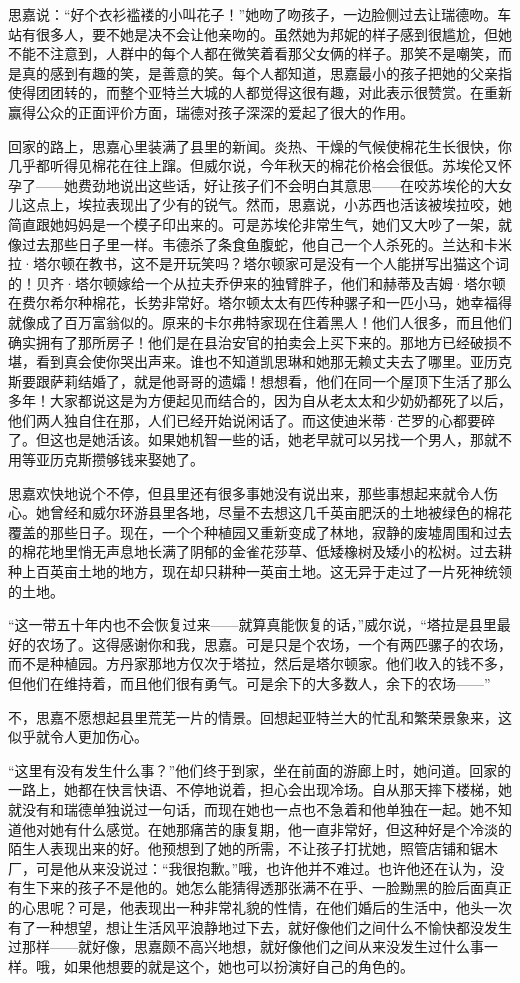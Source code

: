 \par 思嘉说：“好个衣衫褴褛的小叫花子！”她吻了吻孩子，一边脸侧过去让瑞德吻。车站有很多人，要不她是决不会让他亲吻的。虽然她为邦妮的样子感到很尴尬，但她不能不注意到，人群中的每个人都在微笑着看那父女俩的样子。那笑不是嘲笑，而是真的感到有趣的笑，是善意的笑。每个人都知道，思嘉最小的孩子把她的父亲指使得团团转的，而整个亚特兰大城的人都觉得这很有趣，对此表示很赞赏。在重新赢得公众的正面评价方面，瑞德对孩子深深的爱起了很大的作用。
\par 回家的路上，思嘉心里装满了县里的新闻。炎热、干燥的气候使棉花生长很快，你几乎都听得见棉花在往上蹿。但威尔说，今年秋天的棉花价格会很低。苏埃伦又怀孕了——她费劲地说出这些话，好让孩子们不会明白其意思——在咬苏埃伦的大女儿这点上，埃拉表现出了少有的锐气。然而，思嘉说，小苏西也活该被埃拉咬，她简直跟她妈妈是一个模子印出来的。可是苏埃伦非常生气，她们又大吵了一架，就像过去那些日子里一样。韦德杀了条食鱼腹蛇，他自己一个人杀死的。兰达和卡米拉·塔尔顿在教书，这不是开玩笑吗？塔尔顿家可是没有一个人能拼写出猫这个词的！贝齐·塔尔顿嫁给一个从拉夫乔伊来的独臂胖子，他们和赫蒂及吉姆·塔尔顿在费尔希尔种棉花，长势非常好。塔尔顿太太有匹传种骡子和一匹小马，她幸福得就像成了百万富翁似的。原来的卡尔弗特家现在住着黑人！他们人很多，而且他们确实拥有了那所房子！他们是在县治安官的拍卖会上买下来的。那地方已经破损不堪，看到真会使你哭出声来。谁也不知道凯思琳和她那无赖丈夫去了哪里。亚历克斯要跟萨莉结婚了，就是他哥哥的遗孀！想想看，他们在同一个屋顶下生活了那么多年！大家都说这是为方便起见而结合的，因为自从老太太和少奶奶都死了以后，他们两人独自住在那，人们已经开始说闲话了。而这使迪米蒂·芒罗的心都要碎了。但这也是她活该。如果她机智一些的话，她老早就可以另找一个男人，那就不用等亚历克斯攒够钱来娶她了。
\par 思嘉欢快地说个不停，但县里还有很多事她没有说出来，那些事想起来就令人伤心。她曾经和威尔环游县里各地，尽量不去想这几千英亩肥沃的土地被绿色的棉花覆盖的那些日子。现在，一个个种植园又重新变成了林地，寂静的废墟周围和过去的棉花地里悄无声息地长满了阴郁的金雀花莎草、低矮橡树及矮小的松树。过去耕种上百英亩土地的地方，现在却只耕种一英亩土地。这无异于走过了一片死神统领的土地。
\par “这一带五十年内也不会恢复过来——就算真能恢复的话，”威尔说，“塔拉是县里最好的农场了。这得感谢你和我，思嘉。可是只是个农场，一个有两匹骡子的农场，而不是种植园。方丹家那地方仅次于塔拉，然后是塔尔顿家。他们收入的钱不多，但他们在维持着，而且他们很有勇气。可是余下的大多数人，余下的农场——”
\par 不，思嘉不愿想起县里荒芜一片的情景。回想起亚特兰大的忙乱和繁荣景象来，这似乎就令人更加伤心。
\par “这里有没有发生什么事？”他们终于到家，坐在前面的游廊上时，她问道。回家的一路上，她都在快言快语、不停地说着，担心会出现冷场。自从那天摔下楼梯，她就没有和瑞德单独说过一句话，而现在她也一点也不急着和他单独在一起。她不知道他对她有什么感觉。在她那痛苦的康复期，他一直非常好，但这种好是个冷淡的陌生人表现出来的好。他预想到了她的所需，不让孩子打扰她，照管店铺和锯木厂，可是他从来没说过：“我很抱歉。”哦，也许他并不难过。也许他还在认为，没有生下来的孩子不是他的。她怎么能猜得透那张满不在乎、一脸黝黑的脸后面真正的心思呢？可是，他表现出一种非常礼貌的性情，在他们婚后的生活中，他头一次有了一种想望，想让生活风平浪静地过下去，就好像他们之间什么不愉快都没发生过那样——就好像，思嘉颇不高兴地想，就好像他们之间从来没发生过什么事一样。哦，如果他想要的就是这个，她也可以扮演好自己的角色的。

